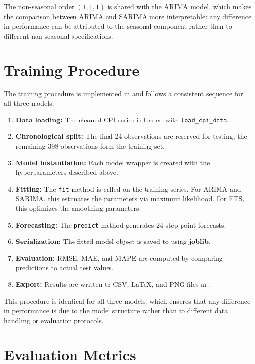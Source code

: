 The non-seasonal order $(1,1,1)$ is shared with the ARIMA model, which makes the comparison between ARIMA and SARIMA more interpretable: any difference in performance can be attributed to the seasonal component rather than to different non-seasonal specifications.

\section{Training Procedure}

The training procedure is implemented in  and follows a consistent sequence for all three models:

\begin{enumerate}
	\item \textbf{Data loading:} The cleaned CPI series is loaded with \texttt{load\_cpi\_data}.
	\item \textbf{Chronological split:} The final 24 observations are reserved for testing; the remaining 398 observations form the training set.
	\item \textbf{Model instantiation:} Each model wrapper is created with the hyperparameters described above.
	\item \textbf{Fitting:} The \texttt{fit} method is called on the training series. For ARIMA and SARIMA, this estimates the parameters via maximum likelihood. For ETS, this optimizes the smoothing parameters.
	\item \textbf{Forecasting:} The \texttt{predict} method generates 24-step point forecasts.
	\item \textbf{Serialization:} The fitted model object is saved to  using \textbf{joblib}.
	\item \textbf{Evaluation:} RMSE, MAE, and MAPE are computed by comparing predictions to actual test values.
	\item \textbf{Export:} Results are written to CSV, LaTeX, and PNG files in .
\end{enumerate}

This procedure is identical for all three models, which ensures that any difference in performance is due to the model structure rather than to different data handling or evaluation protocols.

\section{Evaluation Metrics}

